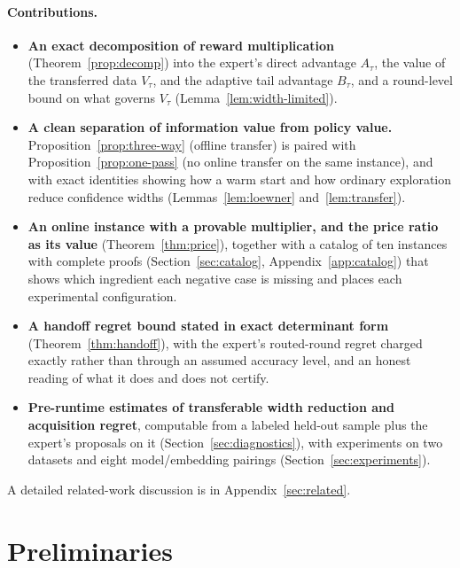 \documentclass{article}
\theoremstyle{definition}
\theoremstyle{remark}
\theoremstyle{remark}
\begin{document}
\paragraph{Contributions.}
\begin{itemize}[itemsep=1pt, topsep=1pt, leftmargin=*]
\item \textbf{An exact decomposition of reward multiplication}
(Theorem~\ref{prop:decomp}) into the expert's direct advantage $A_\tau$,
the value of the transferred data $V_\tau$, and the adaptive tail advantage
$B_\tau$, and a round-level bound on what governs $V_\tau$
(Lemma~\ref{lem:width-limited}).
\item \textbf{A clean separation of information value from policy value.}
Proposition~\ref{prop:three-way} (offline transfer) is paired with
Proposition~\ref{prop:one-pass} (no online transfer on the same instance),
and with exact identities showing how a warm start and how ordinary
exploration reduce confidence widths (Lemmas~\ref{lem:loewner}
and~\ref{lem:transfer}).
\item \textbf{An online instance with a provable multiplier, and the price
ratio as its value} (Theorem~\ref{thm:price}), together with a catalog of
ten instances with complete proofs (Section~\ref{sec:catalog},
Appendix~\ref{app:catalog}) that shows which ingredient each negative case is
missing and places each experimental configuration.
\item \textbf{A handoff regret bound stated in exact determinant form}
(Theorem~\ref{thm:handoff}), with the expert's routed-round regret charged
exactly rather than through an assumed accuracy level, and an honest reading
of what it does and does not certify.
\item \textbf{Pre-runtime estimates of transferable width reduction and
acquisition regret}, computable from a labeled held-out sample plus the
expert's proposals on it (Section~\ref{sec:diagnostics}), with experiments on
two datasets and eight model/embedding pairings (Section~\ref{sec:experiments}).
\end{itemize}
A detailed related-work discussion is in Appendix~\ref{sec:related}.


\section{Preliminaries}
\label{sec:preliminaries}
\end{document}
